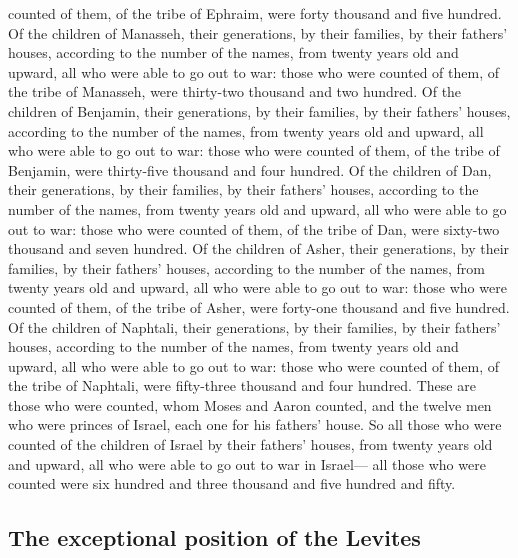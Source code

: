 counted of them, of the tribe of Ephraim, were forty thousand and five
hundred.  Of the children of Manasseh, their generations,
by their families, by their fathers' houses, according to the number of
the names, from twenty years old and upward, all who were able to go out
to war:  those who were counted of them, of the tribe of
Manasseh, were thirty-two thousand and two hundred.  Of
the children of Benjamin, their generations, by their families, by their
fathers' houses, according to the number of the names, from twenty years
old and upward, all who were able to go out to war: 
those who were counted of them, of the tribe of Benjamin, were
thirty-five thousand and four hundred.  Of the children
of Dan, their generations, by their families, by their fathers' houses,
according to the number of the names, from twenty years old and upward,
all who were able to go out to war:  those who were
counted of them, of the tribe of Dan, were sixty-two thousand and seven
hundred.  Of the children of Asher, their generations, by
their families, by their fathers' houses, according to the number of the
names, from twenty years old and upward, all who were able to go out to
war:  those who were counted of them, of the tribe of
Asher, were forty-one thousand and five hundred.  Of the
children of Naphtali, their generations, by their families, by their
fathers' houses, according to the number of the names, from twenty years
old and upward, all who were able to go out to war: 
those who were counted of them, of the tribe of Naphtali, were
fifty-three thousand and four hundred.  These are those
who were counted, whom Moses and Aaron counted, and the twelve men who
were princes of Israel, each one for his fathers' house. 
So all those who were counted of the children of Israel by their
fathers' houses, from twenty years old and upward, all who were able to
go out to war in Israel---  all those who were counted
were six hundred and three thousand and five hundred and fifty.

\hypertarget{the-exceptional-position-of-the-levites}{%
\subsection{The exceptional position of the
Levites}\label{the-exceptional-position-of-the-levites}}

